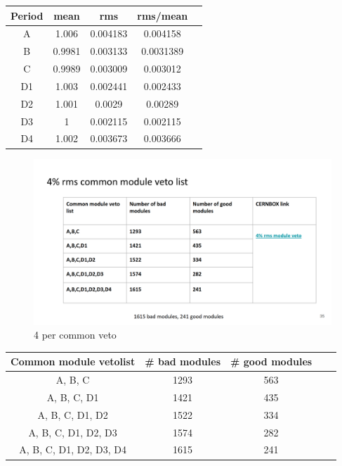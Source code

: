 \begin{table}[!ht]
\centering
{}
\begin{tabular}{ccccc}
    \textbf{Period} & \textbf{mean} & \textbf{rms} &  \textbf{rms/mean} \\ \hline
    A & 1.006 & 0.004183 & 0.004158 \\
    B & 0.9981  & 0.003133 & 0.0031389 \\
    C & 0.9989  & 0.003009 & 0.003012\\
    D1 & 1.003  & 0.002441 & 0.002433 \\
    D2 & 1.001  & 0.0029 & 0.00289 \\
   D3  & 1  & 0.002115 & 0.002115 \\
   D4  & 1.002  & 0.003673 & 0.003666 \\ 
\end{tabular}
\label{tab:pccvis_diffveto}
\end{table}



\begin{figure}[!htp]
\centering
\includegraphics[width=1\textwidth]{ashish_thesis/4per_rms_common_veto.png}
\caption{%
   4 per common veto
}
\label{fig:4per common veto}
\end{figure}


\begin{table}[!ht]
\centering
{}
\begin{tabular}{ccccc}
    \textbf{Common module vetolist} & \textbf{# bad modules} & \textbf{# good modules} \\ \hline
    A, B, C & 1293 & 563  \\
    A, B, C, D1 & 1421  & 435  \\
    A, B, C, D1, D2 & 1522  & 334 \\
    A, B, C, D1, D2, D3 & 1574  & 282  \\
   A, B, C, D1, D2, D3, D4  & 1615  & 241 \\
\end{tabular}
\label{tab:pccvis_diffveto}
\end{table}






